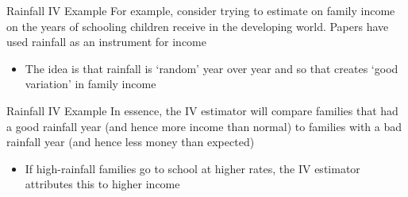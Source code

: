 \documentclass[aspectratio=169,t,11pt,table]{beamer}
\begin{document}
% 
% 
% 
% 


\begin{frame}{Rainfall IV Example}
  For example, consider trying to estimate on family income on the years of schooling children receive in the developing world. Papers have used rainfall as an instrument for income
  \begin{itemize}
    \item The idea is that rainfall is `random' year over year and so that creates `good variation' in family income
  \end{itemize}
\end{frame}

\begin{frame}{Rainfall IV Example}
  In essence, the IV estimator will compare families that had a good rainfall year (and hence more income than normal) to families with a bad rainfall year (and hence less money than expected)
  \begin{itemize}
    \item If high-rainfall families go to school at higher rates, the IV estimator attributes this to higher income
  \end{itemize}
\end{frame}
\end{document}
